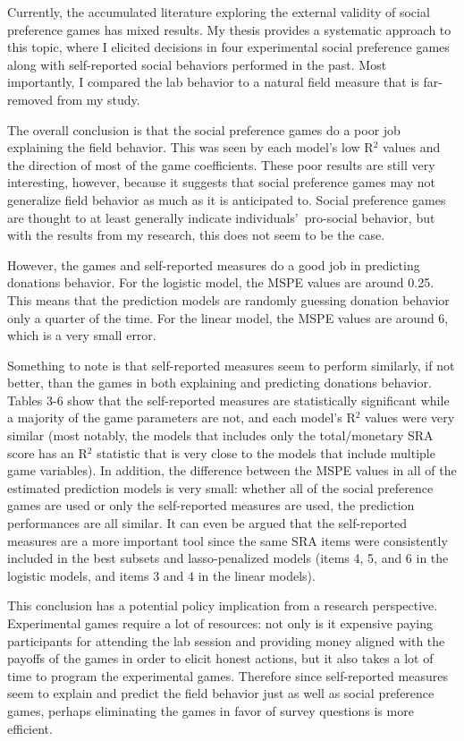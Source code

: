 \documentclass[12pt]{article}
\begin{document}
Currently, the accumulated literature exploring the external validity of social preference games has mixed results. My thesis provides a systematic approach to this topic, where I elicited decisions in four experimental social preference games along with self-reported social behaviors performed in the past. Most importantly, I compared the lab behavior to a natural field measure that is far-removed from my study.

The overall conclusion is that the social preference games do a poor job explaining the field behavior. This was seen by each model\rq s low R$^{2}$ values and the direction of most of the game coefficients. These poor results are still very interesting, however, because it suggests that social preference games may not generalize field behavior as much as it is anticipated to. Social preference games are thought to at least generally indicate individuals\rq \ pro-social behavior, but with the results from my research, this does not seem to be the case.

However, the games and self-reported measures do a good job in predicting donations behavior. For the logistic model, the MSPE values are around 0.25. This means that the prediction models are randomly guessing donation behavior only a quarter of the time. For the linear model, the MSPE values are around 6, which is a very small error. 

Something to note is that self-reported measures seem to perform similarly, if not better, than the games in both explaining and predicting donations behavior. Tables 3-6 show that the self-reported measures are statistically significant while a majority of the game parameters are not, and each model\rq s R$^{2}$ values were very similar (most notably, the models that includes only the total/monetary SRA score has an R$^{2}$ statistic that is very close to the models that include multiple game variables). In addition, the difference between the MSPE values in all of the estimated prediction models is very small: whether all of the social preference games are used or only the self-reported measures are used, the prediction performances are all similar. It can even be argued that the self-reported measures are a more important tool since the same SRA items were consistently included in the best subsets and lasso-penalized models (items 4, 5, and 6 in the logistic models, and items 3 and 4 in the linear models).

This conclusion has a potential policy implication from a research perspective. Experimental games require a lot of resources: not only is it expensive paying participants for attending the lab session and providing money aligned with the payoffs of the games in order to elicit honest actions, but it also takes a lot of time to program the experimental games. Therefore since self-reported measures seem to explain and predict the field behavior just as well as social preference games, perhaps eliminating the games in favor of survey questions is more efficient.
\end{document}
